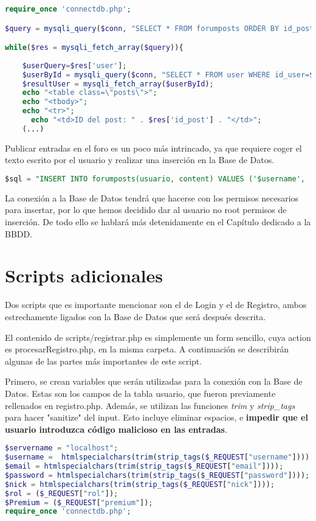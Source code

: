 \documentclass[12pt]{report}
\begin{document}
\begin{lstlisting}[language=PHP]
require_once 'connectdb.php';

$query = mysqli_query($conn, "SELECT * FROM forumposts ORDER BY id_post DESC");

while($res = mysqli_fetch_array($query)){
    
    $userQuery=$res['user'];
    $userById = mysqli_query($conn, "SELECT * FROM user WHERE id_user=$userQuery");  
    $resultUser = mysqli_fetch_array($userById);
    echo "<table class=\"posts\">";
    echo "<tbody>";
    echo "<tr>";
	  echo "<td>ID del post: " . $res['id_post'] . "</td>";
    (...)
\end{lstlisting}

Publicar entradas en el foro es un poco más intrincado, ya que requiere coger el texto escrito por el usuario y realizar una inserción en la Base de Datos.
\newline

\begin{lstlisting}[language=SQL]
$sql = "INSERT INTO forumposts(usuario, content) VALUES ('$username', '$contenido')";
\end{lstlisting}
La conexión a la Base de Datos tendrá que hacerse con los permisos necesarios para insertar, por lo que hemos decidido dar al usuario no root permisos de inserción. De todo ello se hablará más detenidamente en el Capítulo dedicado a la BBDD.

 \newpage
\section{Scripts adicionales}
Dos scripts que es importante mencionar son el de Login y el de Registro, ambos estrechamente ligados con la Base de Datos que será después descrita. 

El contenido de scripts/registrar.php es simplemente un form sencillo, cuya action es procesarRegistro.php, en la misma carpeta. A continuación se describirán algunas de las partes más importantes de este script.

Primero, se crean variables que serán utilizadas para la conexión con la Base de Datos. Estas son los campos de la tabla usuario, que fueron previamente rellenados en registro.php. Además, se utilizan las funciones \textit{trim} y \textit{strip\_tags} para hacer "sanitize" del input. Esto incluye eliminar espacios, e \textbf{impedir que el usuario introduzca código malicioso en las entradas}.
\newline
\begin{lstlisting}[language=PHP]
$servername = "localhost";
$username =  htmlspecialchars(trim(strip_tags($_REQUEST["username"])));
$email = htmlspecialchars(trim(strip_tags($_REQUEST["email"])));
$password = htmlspecialchars(trim(strip_tags($_REQUEST["password"])));
$nick = htmlspecialchars(trim(strip_tags($_REQUEST["nick"])));
$rol = ($_REQUEST["rol"]);
$Premium = ($_REQUEST["premium"]);
require_once 'connectdb.php';
\end{lstlisting}
\end{document}
